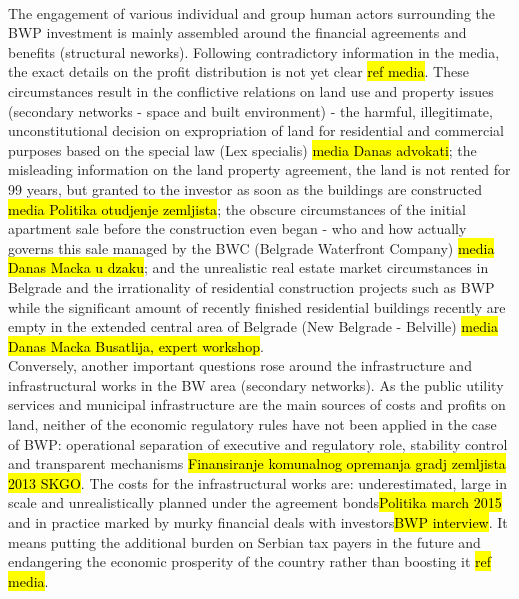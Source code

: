 \documentclass[11pt]{report}
\begin{document}
\\
The engagement of various individual and group human actors surrounding the BWP investment is mainly assembled around the financial agreements and benefits (structural neworks). Following contradictory information in the media, the exact details on the profit distribution is not yet clear \hl{ref media}.
These circumstances result in the conflictive relations on land use and property issues (secondary networks - space and built environment) - the harmful, illegitimate, unconstitutional decision on expropriation of land for residential and commercial purposes based on the special law (Lex specialis) \hl{media Danas advokati}; the misleading information on the land property agreement, the land is not rented for 99 years, but granted to the investor as soon as the buildings are constructed \hl{media Politika otudjenje zemljista}; the obscure circumstances of the initial apartment sale before the construction even began - who and how actually governs this sale managed by the BWC (Belgrade Waterfront Company) \hl{media Danas Macka u dzaku}; and the unrealistic real estate market circumstances in Belgrade and the irrationality of residential construction projects such as BWP while the significant amount of recently finished residential buildings recently are empty in the extended central area of Belgrade (New Belgrade - Belville) \hl{media Danas Macka Busatlija, expert workshop}.   
\\
Conversely, another important questions rose around the infrastructure and infrastructural works in the BW area (secondary networks).
As the public utility services and municipal infrastructure are the main sources of costs and profits on land, neither of the economic regulatory rules have not been applied in the case of BWP: 
operational separation of executive and regulatory role, stability control and transparent mechanisms \hl{Finansiranje komunalnog opremanja gradj zemljista 2013 SKGO}.
The costs for the infrastructural works are: underestimated, large in scale and unrealistically planned under the agreement bonds\footnotemark \hl{Politika march 2015}
and in practice marked by murky financial deals with investors\footnotemark \hl{BWP interview}. It means putting the additional burden on Serbian tax payers in the future and endangering the economic prosperity of the country rather than boosting it \hl{ref media}.
\end{document}
